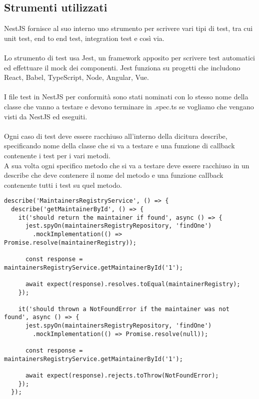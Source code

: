 \subsection{Strumenti utilizzati}
NestJS fornisce al suo interno uno strumento per scrivere vari tipi di test, tra cui unit test, 
end to end test, integration test e così via. 
\\\\
Lo strumento di test usa Jest, un framework apposito per scrivere test automatici ed effettuare 
il mock dei componenti. Jest funziona su progetti che includono  React, Babel, TypeScript, Node,
Angular, Vue.
\\\\
I file test in NestJS per conformità sono stati nominati con lo stesso nome della classe che vanno
a testare e devono terminare in .spec.ts se vogliamo che vengano visti da NestJS ed eseguiti.
\\\\
Ogni caso di test deve essere racchiuso all'interno della dicitura describe, specificando nome della
classe che si va a testare e una funzione di callback contenente i test per i vari metodi.
\\
A sua volta ogni specifico metodo che si va a testare deve essere racchiuso in un describe che deve
contenere il nome del metodo e una funzione callback contenente tutti i test su quel metodo.
\\
\begin{lstlisting}
describe('MaintainersRegistryService', () => {
  describe('getMaintainerById', () => {
    it('should return the maintainer if found', async () => {
      jest.spyOn(maintainersRegistryRepository, 'findOne')
        .mockImplementation(() => Promise.resolve(maintainerRegistry));

      const response = maintainersRegistryService.getMaintainerById('1');

      await expect(response).resolves.toEqual(maintainerRegistry);
    });

    it('should thrown a NotFoundError if the maintainer was not found', async () => {
      jest.spyOn(maintainersRegistryRepository, 'findOne')
        .mockImplementation(() => Promise.resolve(null));

      const response = maintainersRegistryService.getMaintainerById('1');

      await expect(response).rejects.toThrow(NotFoundError);
    });
  });
\end{lstlisting}

